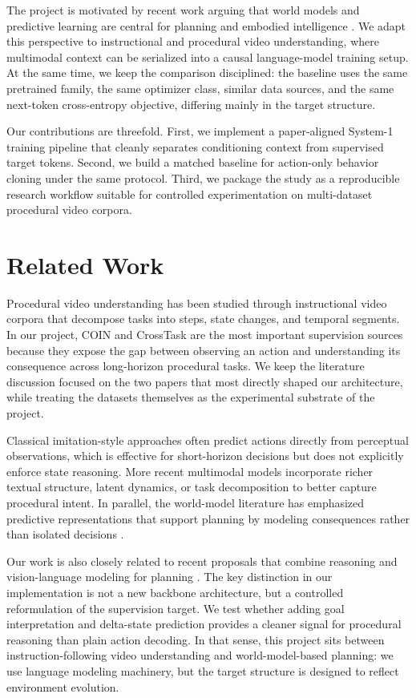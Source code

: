 \documentclass[11pt]{article}
\begin{document}
The project is motivated by recent work arguing that world models and predictive learning are central for planning and embodied intelligence \citep{assran2025vjepa2, chen2025planning}. We adapt this perspective to instructional and procedural video understanding, where multimodal context can be serialized into a causal language-model training setup. At the same time, we keep the comparison disciplined: the baseline uses the same pretrained family, the same optimizer class, similar data sources, and the same next-token cross-entropy objective, differing mainly in the target structure.

Our contributions are threefold. First, we implement a paper-aligned System-1 training pipeline that cleanly separates conditioning context from supervised target tokens. Second, we build a matched baseline for action-only behavior cloning under the same protocol. Third, we package the study as a reproducible research workflow suitable for controlled experimentation on multi-dataset procedural video corpora.

\section{Related Work}
Procedural video understanding has been studied through instructional video corpora that decompose tasks into steps, state changes, and temporal segments. In our project, COIN \citep{tang2019coin} and CrossTask \citep{zhukov2019crossTask} are the most important supervision sources because they expose the gap between observing an action and understanding its consequence across long-horizon procedural tasks. We keep the literature discussion focused on the two papers that most directly shaped our architecture, while treating the datasets themselves as the experimental substrate of the project.

Classical imitation-style approaches often predict actions directly from perceptual observations, which is effective for short-horizon decisions but does not explicitly enforce state reasoning. More recent multimodal models incorporate richer textual structure, latent dynamics, or task decomposition to better capture procedural intent. In parallel, the world-model literature has emphasized predictive representations that support planning by modeling consequences rather than isolated decisions \citep{assran2025vjepa2}.

Our work is also closely related to recent proposals that combine reasoning and vision-language modeling for planning \citep{chen2025planning}. The key distinction in our implementation is not a new backbone architecture, but a controlled reformulation of the supervision target. We test whether adding goal interpretation and delta-state prediction provides a cleaner signal for procedural reasoning than plain action decoding. In that sense, this project sits between instruction-following video understanding and world-model-based planning: we use language modeling machinery, but the target structure is designed to reflect environment evolution.
\end{document}
